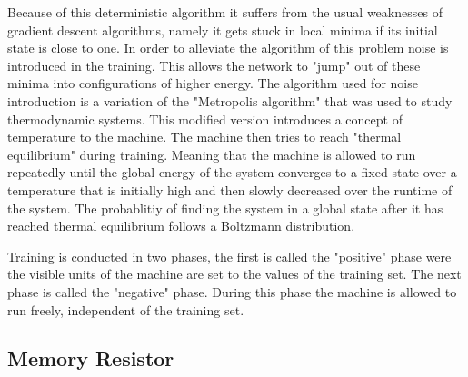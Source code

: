 \documentclass[12pt, a4paper]{article}
\begin{document}
Because of this deterministic algorithm it suffers from the usual weaknesses of gradient descent algorithms, namely it gets stuck in local minima if its initial state is close to one. In order to alleviate the algorithm of this problem noise is introduced in the training. This allows the network to "jump" out of these minima into configurations of higher energy. The algorithm used for noise introduction is a variation of the "Metropolis algorithm" \cite{metropolis1953equation} that was used to study thermodynamic systems. This modified version introduces a concept of temperature to the machine. The machine then tries to reach "thermal equilibrium" during training. Meaning that the machine is allowed to run repeatedly until the global energy of the system converges to a fixed state over a temperature that is initially high and then slowly decreased over the runtime of the system. The probablitiy of finding the system in a global state after it has reached thermal equilibrium follows a Boltzmann distribution.


Training is conducted in two phases, the first is called the "positive" phase were the visible units of the machine are set to the values of the training set. The next phase is called the "negative" phase. During this phase the machine is allowed to run freely, independent of the training set.







\subsection{Memory Resistor}
\end{document}
